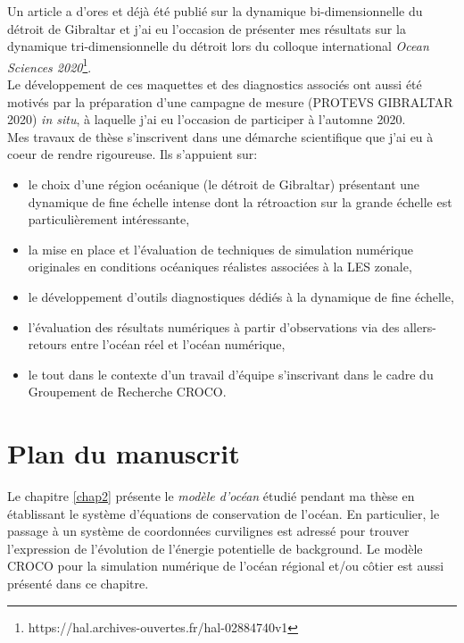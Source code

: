 Un article a d'ores et déjà été publié sur la dynamique bi-dimensionnelle du détroit de Gibraltar \citep{hilt_2020} et j'ai eu l'occasion de présenter mes résultats sur la dynamique tri-dimensionnelle du détroit lors du colloque international \textit{Ocean Sciences 2020}\footnote{https://hal.archives-ouvertes.fr/hal-02884740v1}.\\

Le développement de ces maquettes et des diagnostics associés ont aussi été motivés par la préparation d'une campagne de mesure (PROTEVS GIBRALTAR 2020) \textit{in situ}, à laquelle j'ai eu l'occasion de participer à l'automne 2020. \\


Mes travaux de thèse s'inscrivent  dans une démarche scientifique que j'ai eu à coeur de rendre rigoureuse. Ils s'appuient sur:
\begin{itemize}
\setlength\itemsep{0pt}
    \item le choix d'une région océanique (le détroit de Gibraltar) présentant une dynamique de fine échelle intense dont la rétroaction sur la grande échelle est particulièrement intéressante,
    \item la mise en place et l'évaluation de techniques de simulation numérique originales en conditions océaniques réalistes associées à la LES zonale,
    \item le développement d'outils diagnostiques dédiés à la dynamique de fine échelle,
    \item l'évaluation des résultats numériques à partir d'observations via des allers-retours entre l'océan réel et l'océan numérique,
    \item le tout dans le contexte d'un travail d'équipe s'inscrivant dans le cadre du Groupement de Recherche CROCO.
\end{itemize}

\section{Plan du manuscrit}

Le chapitre \ref{chap2} présente le \textit{modèle d'océan} étudié pendant ma thèse en établissant le système d'équations de conservation de l'océan. En particulier, le passage à un système de coordonnées curvilignes est adressé pour trouver l'expression de l'évolution de l'énergie potentielle de background. Le modèle CROCO pour la simulation numérique de l'océan régional et/ou côtier est aussi présenté dans ce chapitre.

